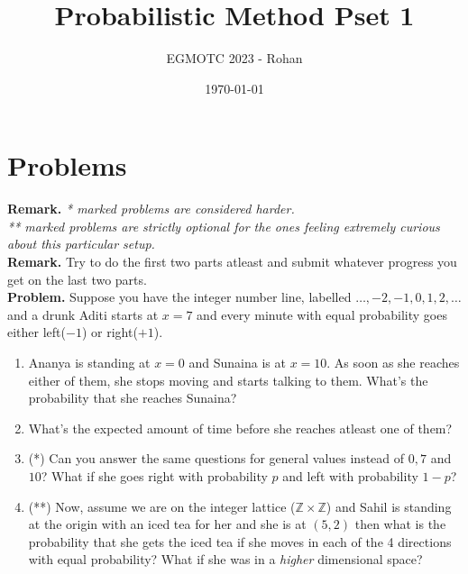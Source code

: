 \documentclass[12pt]{article}
\title{Probabilistic Method Pset 1}
\author{EGMOTC 2023 - Rohan}
\date{\today}
\begin{document}
\maketitle

\newcommand{\localtextbulletone}{\textcolor{black}{\raisebox{.45ex}{\rule{.6ex}{.6ex}}}}
\renewcommand{\labelitemi}{\localtextbulletone}

\section*{Problems}
\vspace{1cm}
\thispagestyle{empty}

\textbf{Remark.} \textit{* marked problems are considered harder.\\ ** marked problems are strictly optional for the ones feeling extremely curious about this particular setup.\\}
\textbf{Remark.} Try to do the first two parts atleast and submit whatever progress you get on the last two parts.\\

\textbf{Problem.} Suppose you have the integer number line, labelled $\ldots,-2,-1,0,1,2,\ldots$ and a drunk Aditi starts at $x=7$ and every minute with equal probability goes either left($-1$) or right($+1$).
    \begin{enumerate}
        \item Ananya is standing at $x=0$ and Sunaina is at $x=10$. As soon as she reaches either of them, she stops moving and starts talking to them. What's the probability that she reaches Sunaina?
        \item What's the expected amount of time before she reaches atleast one of them?
        \item (*) Can you answer the same questions for general values instead of $0,7$ and $10$? What if she goes right with probability $p$ and left with probability $1-p$?
        \item (**) Now, assume we are on the integer lattice ($\mathbb{Z}\times \mathbb{Z}$) and Sahil is standing at the origin with an iced tea for her and she is at $(5,2)$ then what is the probability that she gets the iced tea if she moves in each of the 4 directions with equal probability? What if she was in a \textit{higher} dimensional space?  
    \end{enumerate}
\end{document}
